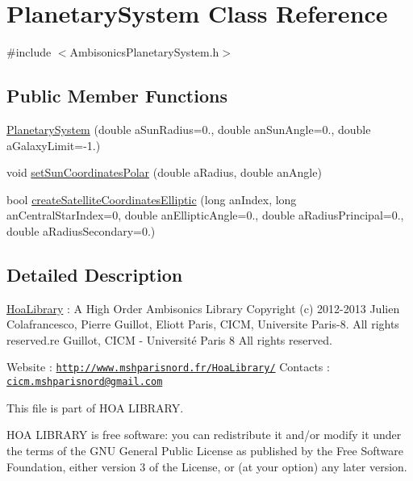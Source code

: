 \hypertarget{class_planetary_system}{\section{Planetary\-System Class Reference}
\label{class_planetary_system}
}


{\ttfamily \#include $<$Ambisonics\-Planetary\-System.\-h$>$}

\subsection*{Public Member Functions}
\begin{DoxyCompactItemize}
\item 
\hyperlink{class_planetary_system_a75364e14ed8680b68939ed5049cbb140}{Planetary\-System} (double a\-Sun\-Radius=0., double an\-Sun\-Angle=0., double a\-Galaxy\-Limit=-\/1.)
\item 
void \hyperlink{class_planetary_system_ac46b592ee753adf63d50d2b96057a1f5}{set\-Sun\-Coordinates\-Polar} (double a\-Radius, double an\-Angle)
\item 
bool \hyperlink{class_planetary_system_a34cd29ee0fe9d66c6e76a345a8d3f29b}{create\-Satellite\-Coordinates\-Elliptic} (long an\-Index, long an\-Central\-Star\-Index=0, double an\-Elliptic\-Angle=0., double a\-Radius\-Principal=0., double a\-Radius\-Secondary=0.)
\end{DoxyCompactItemize}


\subsection{Detailed Description}
\hyperlink{interface_hoa_library}{Hoa\-Library} \-: A High Order Ambisonics Library Copyright (c) 2012-\/2013 Julien Colafrancesco, Pierre Guillot, Eliott Paris, C\-I\-C\-M, Universite Paris-\/8. All rights reserved.\-re Guillot, C\-I\-C\-M -\/ Université Paris 8 All rights reserved.

Website \-: \href{http://www.mshparisnord.fr/HoaLibrary/}{\tt http\-://www.\-mshparisnord.\-fr/\-Hoa\-Library/} Contacts \-: \href{mailto:cicm.mshparisnord@gmail.com}{\tt cicm.\-mshparisnord@gmail.\-com}

This file is part of H\-O\-A L\-I\-B\-R\-A\-R\-Y.

H\-O\-A L\-I\-B\-R\-A\-R\-Y is free software\-: you can redistribute it and/or modify it under the terms of the G\-N\-U General Public License as published by the Free Software Foundation, either version 3 of the License, or (at your option) any later version.

